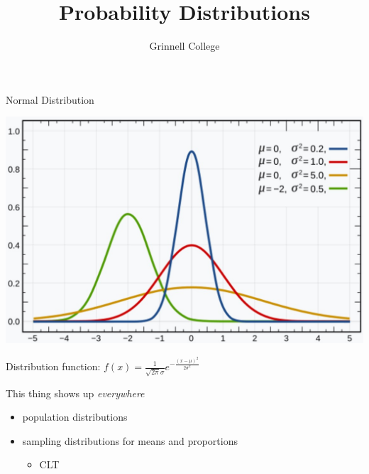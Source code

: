 \documentclass{beamer}
\title[Introduction to Statistics]{Probability Distributions}
\subtitle{}
\author{Grinnell College}
\date{}
\begin{document}
\begin{frame}
  \titlepage
\end{frame}

\begin{frame}{Normal Distribution}
\begin{center}
    \includegraphics[scale=.4]{img/normaldist.jpg}
\end{center}
Distribution function: $f(x) = \frac{1}{\sqrt{2\pi}\sigma}e^{-\frac{(x-\mu)^2}{2\sigma^2}}$ \vspace{2mm}

This thing shows up \textit{everywhere}
\begin{itemize}
    \item population distributions
    \item sampling distributions for means and proportions
    \begin{itemize}
        \item CLT
    \end{itemize}
\end{itemize}
\end{frame}
\end{document}
